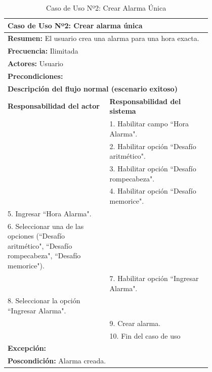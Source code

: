 \begin{table}[H]
    \centering
    \caption{Caso de Uso Nº2: Crear Alarma Única}
    
    \begin{tabular}{| p{0.4\linewidth} | p{0.4\linewidth} |}
        \hline
        \multicolumn{2}{|l|}{\textbf{Caso de Uso Nº2:} Crear alarma única} \\
        \hline
        \multicolumn{2}{|l|}{\textbf{Resumen:} El usuario crea una alarma para una hora exacta.} \\
        \hline
        \multicolumn{2}{|l|}{\textbf{Frecuencia:} Ilimitada} \\
        \hline
        \multicolumn{2}{|l|}{\textbf{Actores:} Usuario} \\
        \hline
        \multicolumn{2}{|l|}{\textbf{Precondiciones:}} \\
        \hline
        \multicolumn{2}{|l|}{\textbf{Descripción del flujo normal (escenario exitoso)} } \\
        \hline
        \textbf{Responsabilidad del actor} & \textbf{Responsabilidad del sistema} \\
        & 1. Habilitar campo ``Hora Alarma". \\
        & 2. Habilitar opción ``Desafío aritmético". \\
        & 3. Habilitar opción ``Desafío rompecabeza". \\
        & 4. Habilitar opción ``Desafío memorice". \\
        5. Ingresar ``Hora Alarma". &\\
        6. Seleccionar una de las opciones (``Desafío aritmético", ``Desafío rompecabeza", ``Desafío memorice"). & \\
        & 7. Habilitar opción ``Ingresar Alarma". \\
        8. Seleccionar la opción ``Ingresar Alarma". &\\
        & 9. Crear alarma. \\
        & 10. Fin del caso de uso \\
        \hline
        \multicolumn{2}{|p{0.8\linewidth}|}{\textbf{Excepción:}}\\
        \hline
        \multicolumn{2}{|l|}{\textbf{Poscondición:} Alarma creada.} \\
        \hline
    \end{tabular}

    \label{table:2}
\end{table}

